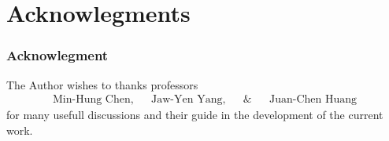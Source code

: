 \section[]{Acknowlegments}
\begin{frame} \frametitle{Acknowlegment}
The Author wishes to thanks professors
\begin{align*}
&\text{Min-Hung Chen,}& &\text{Jaw-Yen Yang,}& &\text{\&}& &\text{Juan-Chen Huang}&
\end{align*}
for many usefull discussions and their guide in the development of the current work.
\end{frame}